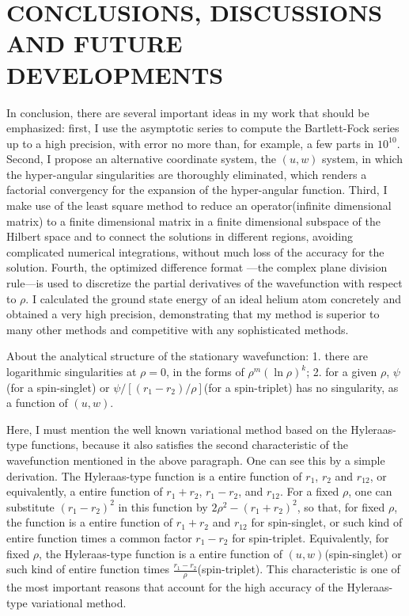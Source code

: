 \section{CONCLUSIONS, DISCUSSIONS AND FUTURE DEVELOPMENTS}

In conclusion, there are several important ideas in my work that
should be emphasized: first, I use the asymptotic series to compute
the Bartlett-Fock series up to a high precision, with error no more than,
for example, a few parts in $10^{10}$. Second, I propose an alternative
coordinate system, the $(u,w)$ system, in which the hyper-angular
singularities are thoroughly eliminated, which renders a factorial
convergency for the expansion of the hyper-angular function. Third,
I make use of the least square method to reduce an operator(infinite
dimensional matrix) to a finite dimensional matrix in a finite dimensional
subspace of the Hilbert space and to connect the solutions in different
regions, avoiding complicated numerical integrations, without much loss
of the accuracy for the solution. Fourth, the optimized difference format
---the complex plane division rule---is used to discretize the partial
derivatives of the wavefunction with respect to $\rho$. I calculated the
ground state energy of an ideal helium atom concretely and obtained a very
high precision, demonstrating that my method is superior to many other
methods and competitive with any sophisticated methods.

About the analytical structure of the stationary wavefunction:
1. there are logarithmic singularities at $\rho=0$, in the forms
of $\rho^{m}(\ln\rho)^{k}$; 2. for a given $\rho$, $\psi$ (for a spin-singlet)
or $\psi/[(r_{1}-r_{2})/\rho]$(for a spin-triplet) has no singularity,
as a function of $(u,w)$.

Here, I must mention the well known variational method based on
the Hyleraas-type functions, because it also
satisfies the second characteristic of
the wavefunction mentioned in the above paragraph.
One can see this by
a simple derivation. The Hyleraas-type function is a entire function
of $r_1$, $r_2$ and $r_{12}$, or equivalently, a entire function
of $r_{1}+r_{2}$, $r_{1}-r_{2}$, and $r_{12}$. For a fixed $\rho$,
one can substitute $(r_{1}-r_{2})^2$ in this function by
$2\rho^{2}-(r_{1}+r_{2})^{2}$, so that, for fixed $\rho$,
the function is a entire function
of $r_{1}+r_{2}$ and $r_{12}$ for spin-singlet, or such kind of entire
function times a common factor $r_{1}-r_{2}$ for spin-triplet. Equivalently,
for fixed $\rho$, the Hyleraas-type function is a entire function of
$(u,w)$(spin-singlet) or such kind of entire function times
$\frac{r_{1}-r_{2}}{\rho}$(spin-triplet).
This characteristic is one of the most important reasons that
account for the high accuracy of the Hyleraas-type variational method.

